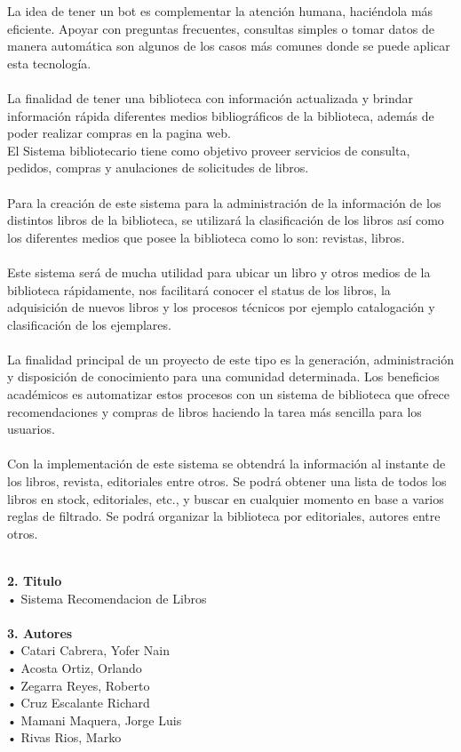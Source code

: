 \begin{flushleft}
\begin{itemize}
La idea de tener un bot es complementar la atención humana, haciéndola más eficiente. Apoyar con preguntas frecuentes, consultas simples o tomar datos de manera automática son algunos de los casos más comunes donde se puede aplicar esta tecnología.\textbf{ }\\
\textbf{ }\\
La finalidad de tener una biblioteca con información actualizada y brindar información rápida diferentes medios bibliográficos de la biblioteca, además de poder realizar compras en la pagina web.\textbf{ }\\
El Sistema bibliotecario tiene como objetivo proveer servicios de consulta, pedidos, compras y anulaciones de solicitudes de libros.
\textbf{ }\\
\textbf{ }\\
Para la creación de este sistema para la administración de la información de los distintos libros de la biblioteca, se utilizará la clasificación de los libros así como los diferentes medios que posee la biblioteca como lo son: revistas, libros.
 \textbf{ }\\
\textbf{ }\\
Este sistema será de mucha utilidad para ubicar un libro y otros medios de la biblioteca rápidamente, nos facilitará conocer el status de los libros, la adquisición de nuevos libros y los procesos técnicos por ejemplo catalogación y clasificación de los ejemplares.
\textbf{ }\\
\textbf{ }\\
La finalidad principal de un proyecto de este tipo es la generación, administración y disposición de conocimiento para una comunidad determinada.
Los beneficios académicos es automatizar estos procesos con un sistema de biblioteca que ofrece recomendaciones y compras de libros haciendo la tarea más sencilla para los usuarios.
\textbf{ }\\
\textbf{ }\\
Con la implementación de este sistema se obtendrá la información al instante de los libros, revista, editoriales entre otros. Se podrá obtener una lista de todos los libros en stock, editoriales, etc., y buscar en cualquier momento en base a varios reglas de filtrado. Se podrá organizar la biblioteca por editoriales, autores entre otros.



\textbf{ }\\
\textbf{2.	Titulo}\\
•         Sistema Recomendacion de Libros
\textbf{ }\\
\textbf{ }\\
\textbf{3.	Autores}\\
•	Catari Cabrera, Yofer Nain\textbf{ }\\
•	Acosta Ortiz, Orlando \textbf{ }\\
•	Zegarra Reyes, Roberto\textbf{ }\\
•	Cruz Escalante Richard\textbf{ }\\
•	Mamani Maquera, Jorge Luis\textbf{ }\\
•	Rivas Rios, Marko\textbf{ }\\



\end{itemize}
\end{flushleft}
